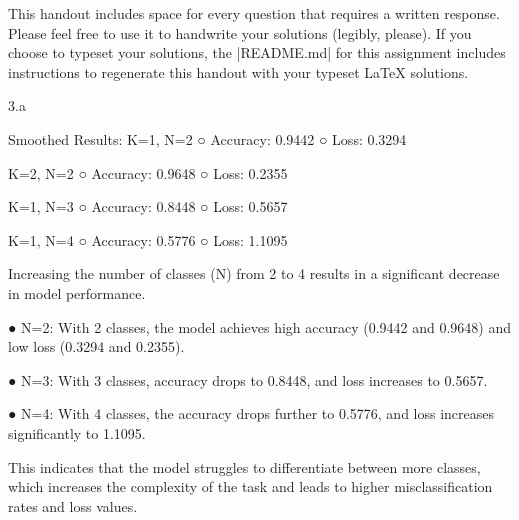 

\def\assignmentnum{2 }
\def\assignmenttitle{XCS330 Problem Set \assignmentnum}


\pagestyle{myheadings} \markboth{}{\assignmenttitle}


This handout includes space for every question that requires a written response.
Please feel free to use it to handwrite your solutions (legibly, please).  If
you choose to typeset your solutions, the |README.md| for this assignment includes
instructions to regenerate this handout with your typeset \LaTeX{} solutions.


\LARGE
3.a
\normalsize

\begin{answer}
    Smoothed Results:
K=1, N=2
○ Accuracy: 0.9442
○ Loss: 0.3294

K=2, N=2
○ Accuracy: 0.9648
○ Loss: 0.2355

K=1, N=3
○ Accuracy: 0.8448
○ Loss: 0.5657

K=1, N=4
○ Accuracy: 0.5776
○ Loss: 1.1095

Increasing the number of classes (N) from 2 to 4 results in a significant decrease in model performance.

● N=2: With 2 classes, the model achieves high accuracy (0.9442 and 0.9648) and low loss (0.3294 and 0.2355).

● N=3: With 3 classes, accuracy drops to 0.8448, and loss increases to 0.5657.

● N=4: With 4 classes, the accuracy drops further to 0.5776, and loss increases significantly to 1.1095.

This indicates that the model struggles to differentiate between more classes, which increases the complexity of the task and leads to higher misclassification rates and loss values.
\end{answer}

